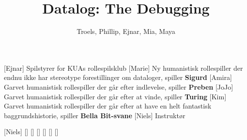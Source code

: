 \documentclass[a4paper,11pt]{article}
\title{Datalog: The Debugging}
\author{Troels, Phillip, Ejnar, Mia, Maya}
\begin{document}
\maketitle

\begin{roles}
[Ejnar] Spilstyrer for KUAs rollespilsklub
[Marie] Ny humanistisk rollespiller der endnu ikke har stereotype
forestillinger om dataloger, spiller \textbf{Sigurd}
[Amira] Garvet humanistisk rollespiller der går efter indlevelse,
spiller \textbf{Preben}
[JoJo] Garvet humanistisk rollespiller der går efter at vinde, spiller
\textbf{Turing}
[Kim] Garvet humanistisk rollespiller der går efter at have en helt
fantastisk baggrundshistorie, spiller \textbf{Bella Bit-svane}
[Niels] Instruktør
\end{roles}

\begin{props}
[Niels]
[]
[]
[]
[]
[]
[]
\end{props}
\end{document}
